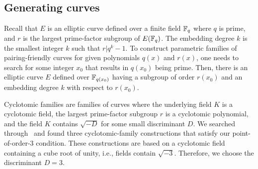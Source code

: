 

\subsection{Generating curves}
\label{subsec:gencurves}

Recall that $E$ is an elliptic curve defined over a finite field $\mathbb{F}_{q}$ where $q$ is prime,
and $r$ is the largest prime-factor subgroup of $E(\mathbb{F}_{q})$.
The embedding degree $k$ is the smallest integer $k$ such that $r | q^k -1$.
To construct parametric families of pairing-friendly curves for given polynomials $q(x)$ and $r(x)$,
one needs to search for some integer $x_0$ that results in $q(x_0)$ being prime.
Then, there is an elliptic curve $E$ defined over $\mathbb{F}_{q(x_0)}$ having a subgroup
of order $r(x_0)$ and an embedding degree $k$ with respect to $r(x_0)$.

Cyclotomic families are families of curves where the underlying field $K$ is a cyclotomic field,
the largest prime-factor subgroup $r$ is a cyclotomic polynomial,
and the field $K$ contains $\sqrt{-D}$ for some small discriminant $D$.
We searched through~\cite{2010/freeman} and found three cyclotomic-family constructions that satisfy our point-of-order-3 condition.
These constructions are based on a cyclotomic field containing a cube root of unity,
i.e., fields contain $\sqrt{-3}$.
Therefore, we choose the discriminant $D = 3$.

